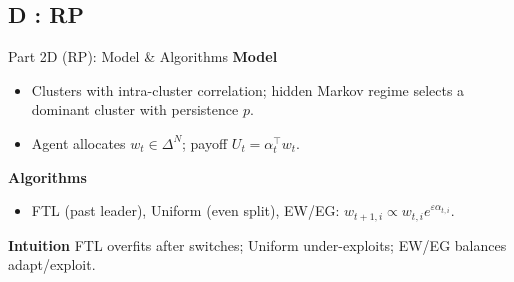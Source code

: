 \documentclass{beamer}
\begin{document}
\subsection{D : RP}

\begin{frame}{Part 2D (RP): Model \& Algorithms}
\textbf{Model}
\begin{itemize}
  \item Clusters with intra-cluster correlation; hidden Markov regime selects a dominant cluster with persistence $p$.
  \item Agent allocates $w_t\in\Delta^N$; payoff $U_t=\alpha_t^\top w_t$.
\end{itemize}
\textbf{Algorithms}
\begin{itemize}
  \item FTL (past leader), Uniform (even split), EW/EG: $w_{t+1,i}\propto w_{t,i}e^{\varepsilon \alpha_{t,i}}$.
\end{itemize}
\textbf{Intuition} FTL overfits after switches; Uniform under-exploits; EW/EG balances adapt/exploit.
\end{frame}
\end{document}
